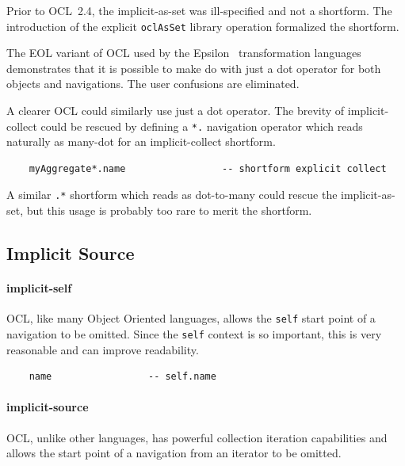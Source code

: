 \documentclass{jot}
\begin{document}
Prior to OCL~2.4, the implicit-as-set was ill-specified and not a shortform. The introduction of the explicit \verb$oclAsSet$ library operation formalized the shortform.

The EOL variant of OCL used by the Epsilon~\cite{Eclipse-Epsilon} transformation languages demonstrates that it is possible to make do with just a dot operator for both objects and navigations. The user confusions are eliminated.

A clearer OCL could similarly use just a dot operator. The brevity of implicit-collect could be rescued by defining a \verb$*.$ navigation operator which reads naturally as many-dot for an implicit-collect shortform.

\begin{verbatim}
    myAggregate*.name                 -- shortform explicit collect
\end{verbatim}

A similar \verb$.*$ shortform which reads as dot-to-many could rescue the implicit-as-set, but this usage is probably too rare to merit the shortform.



\subsection{Implicit Source}

\paragraph{implicit-self} OCL, like many Object Oriented languages, allows the \verb$self$ start point of a navigation to be omitted. Since the \verb$self$ context is so important, this is very reasonable and can improve readability.

\begin{verbatim}
    name                 -- self.name
\end{verbatim}

\paragraph{implicit-source} OCL, unlike other languages, has powerful collection iteration capabilities and allows the start point of a navigation from an iterator to be omitted.
\end{document}
